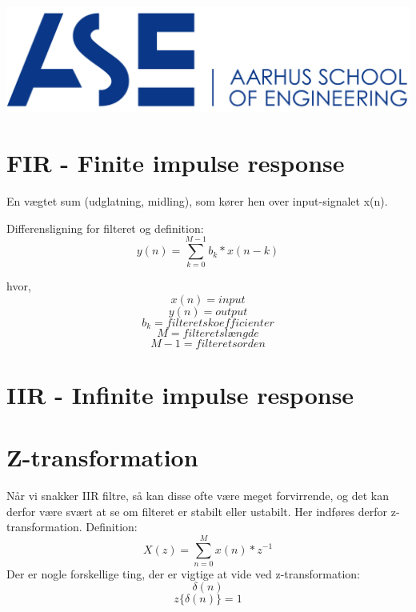 \documentclass[12pt, letterpaper]{article}
\begin{document}
\begin{titlepage}

\includegraphics[scale=0.5]{billeder/au}\\ %
 

\vfill %


\end{titlepage}

\tableofcontents
\newpage

\newpage

\section{FIR - Finite impulse response}

En vægtet sum (udglatning, midling), som kører hen over input-signalet x(n). 

Differensligning for filteret og definition: 
$$ y(n)= \sum\limits_{k=0}^{M-1} b_k * x(n-k)$$

hvor, 
$$ x(n) = input $$
$$ y(n) = output $$
$$ b_k = filterets koefficienter $$ 
$$ M = filterets længde $$
$$ M-1 = filterets orden $$

\section{IIR - Infinite impulse response}

\section{Z-transformation}
Når vi snakker IIR filtre, så kan disse ofte være meget forvirrende, og det kan derfor være svært at se om filteret er stabilt eller ustabilt. Her indføres derfor z-transformation. 
Definition: 
$$ X(z)= \sum\limits_{n=0}^{M} x(n)*z^{-1}$$
Der er nogle forskellige ting, der er vigtige at vide ved z-transformation: 
$$\delta(n)$$
$$ z{\{\delta(n)}\}=1$$
\end{document}

